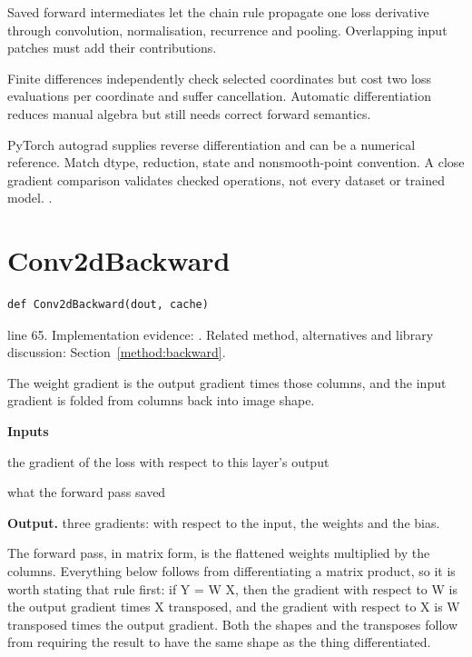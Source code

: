 Saved forward intermediates let the chain rule propagate one loss derivative through convolution, normalisation, recurrence and pooling. Overlapping input patches must add their contributions.


Finite differences independently check selected coordinates but cost two loss evaluations per coordinate and suffer cancellation. Automatic differentiation reduces manual algebra but still needs correct forward semantics.


PyTorch autograd supplies reverse differentiation and can be a numerical reference. Match dtype, reduction, state and nonsmooth-point convention. A close gradient comparison validates checked operations, not every dataset or trained model. \cite{gravesbook,ioffe2015,torchnumeric}.


\section{Conv2dBackward}\label{fn:train:Conv2dBackward}
\begin{lstlisting}[style=sig]
def Conv2dBackward(dout, cache)
\end{lstlisting}
 line 65. Implementation evidence: \cite{code2026}. Related method, alternatives and library discussion: Section~\ref{method:backward}.


The weight gradient is the output gradient times those columns, and the input gradient is folded from columns back into image shape.




\noindent\textbf{Inputs}
\begin{description}[leftmargin=2.2em,style=nextline,font=\normalfont\ttfamily]\setlength\itemsep{1pt}
  \item[{dout}] \normalfont the gradient of the loss with respect to this layer's output
  \item[{cache}] \normalfont what the forward pass saved
\end{description}

\noindent\textbf{Output.} three gradients: with respect to the input, the weights and the bias.


The forward pass, in matrix form, is the flattened weights multiplied by the columns. Everything below follows from differentiating a matrix product, so it is worth stating that rule first: if Y = W X, then the gradient with respect to W is the output gradient times X transposed, and the gradient with respect to X is W transposed times the output gradient. Both the shapes and the transposes follow from requiring the result to have the same shape as the thing differentiated.


